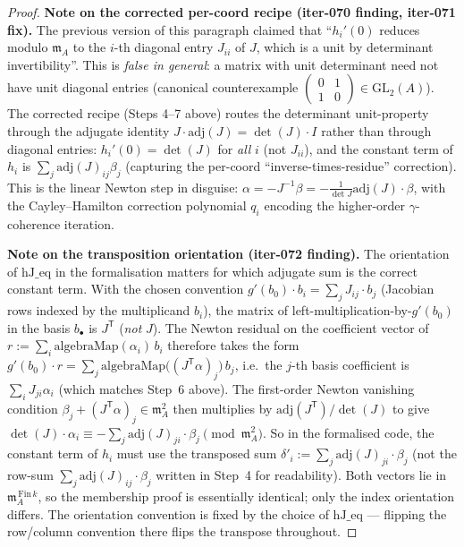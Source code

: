 \begin{proof}
\medskip\noindent\textbf{Note on the corrected per-coord
recipe (iter-070 finding, iter-071 fix).}
The previous version of this paragraph claimed that
``$h_i'(0)$ reduces modulo $\mathfrak m_A$ to the $i$-th
diagonal entry $J_{ii}$ of $J$, which is a unit by determinant
invertibility''. This is \emph{false in general}: a matrix
with unit determinant need not have unit diagonal entries
(canonical counterexample
$\begin{pmatrix} 0 & 1 \\ 1 & 0 \end{pmatrix} \in
\mathrm{GL}_2(A)$).
The corrected recipe (Steps 4–7 above) routes the determinant
unit-property through the adjugate identity $J \cdot
\mathrm{adj}(J) = \det(J) \cdot I$ rather than through
diagonal entries: $h_i'(0) = \det(J)$ for \emph{all} $i$
(not $J_{ii}$), and the constant term of $h_i$ is
$\sum_j \mathrm{adj}(J)_{ij} \beta_j$ (capturing the per-coord
``inverse-times-residue'' correction). This is the linear
Newton step in disguise: $\alpha = -J^{-1} \beta =
-\frac{1}{\det J} \mathrm{adj}(J) \cdot \beta$, with the
Cayley--Hamilton correction polynomial $q_i$ encoding the
higher-order $\gamma$-coherence iteration.

\medskip\noindent\textbf{Note on the transposition orientation
(iter-072 finding).}
The orientation of $\mathrm{hJ\_eq}$ in the formalisation
matters for which adjugate sum is the correct constant term.
With the chosen convention
$g'(b_0) \cdot b_i = \sum_j J_{ij} \cdot b_j$ (Jacobian rows
indexed by the multiplicand $b_i$), the matrix of
left-multiplication-by-$g'(b_0)$ in the basis $b_\bullet$ is
$J^{\mathsf T}$ (\emph{not} $J$). The Newton residual on the
coefficient vector of
$r := \sum_i \mathrm{algebraMap}(\alpha_i) \, b_i$ therefore
takes the form $g'(b_0) \cdot r = \sum_j \mathrm{algebraMap}
\bigl((J^{\mathsf T} \alpha)_j\bigr) \, b_j$, i.e.\ the $j$-th
basis coefficient is $\sum_i J_{ji} \alpha_i$ (which matches
Step~6 above). The first-order Newton vanishing condition
$\beta_j + (J^{\mathsf T} \alpha)_j \in \mathfrak m_A^2$ then
multiplies by $\mathrm{adj}(J^{\mathsf T}) / \det(J)$ to give
$\det(J) \cdot \alpha_i \equiv
-\sum_j \mathrm{adj}(J)_{ji} \cdot \beta_j \pmod{\mathfrak
m_A^2}$. So in the formalised code, the constant term of $h_i$
must use the transposed sum
$\delta'_i := \sum_j \mathrm{adj}(J)_{ji} \cdot \beta_j$
(not the row-sum $\sum_j \mathrm{adj}(J)_{ij} \cdot \beta_j$
written in Step~4 for readability). Both vectors lie in
$\mathfrak m_A^{\,\mathrm{Fin}\,k}$, so the membership proof
is essentially identical; only the index orientation differs.
The orientation convention is fixed by the choice of
$\mathrm{hJ\_eq}$ — flipping the row/column convention there
flips the transpose throughout.


\end{proof}
